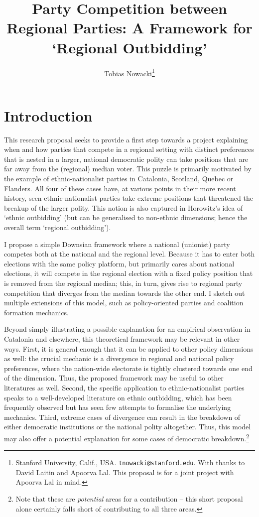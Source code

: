 \documentclass[11pt]{article}
\title{Party Competition between Regional Parties: A Framework for `Regional Outbidding'}
\author{Tobias Nowacki\thanks{Stanford University, Calif., USA. \texttt{tnowacki@stanford.edu}. With thanks to David Laitin and Apoorva Lal. This proposal is for a joint project with Apoorva Lal in mind.}}
\begin{document}
\maketitle

\onehalfspacing

\section{Introduction}

This research proposal seeks to provide a first step towards a project explaining when and how parties that compete in a regional setting with distinct preferences that is nested in a larger, national democratic polity can take positions that are far away from the (regional) median voter. This puzzle is primarily motivated by the example of ethnic-nationalist parties in Catalonia, Scotland, Quebec or Flanders. All four of these cases have, at various points in their more recent history, seen ethnic-nationalist parties take extreme positions that threatened the breakup of the larger polity. This notion is also captured in Horowitz's idea of `ethnic outbidding' (but can be generalised to non-ethnic dimensions; hence the overall term `regional outbidding'). 

I propose a simple Downsian framework where a national (unionist) party competes both at the national and the regional level. Because it has to enter both elections with the same policy platform, but primarily cares about national elections, it will compete in the regional election with a fixed policy position that is removed from the regional median; this, in turn, gives rise to regional party competition that diverges from the median towards the other end. I sketch out multiple extensions of this model, such as policy-oriented parties and coalition formation mechanics.

Beyond simply illustrating a possible explanation for an empirical observation in Catalonia and elsewhere, this theoretical framework may be relevant in other ways. First, it is general enough that it can be applied to other policy dimensions as well: the crucial mechanic is a divergence in regional and national policy preferences, where the nation-wide electorate is tightly clustered towards one end of the dimension. Thus, the proposed framework may be useful to other literatures as well. Second, the specific application to ethnic-nationalist parties speaks to a well-developed literature on ethnic outbidding, which has been frequently observed but has seen few attempts to formalise the underlying mechanics. Third, extreme cases of divergence can result in the breakdown of either democratic institutions or the national polity altogether. Thus, this model may also offer a potential explanation for some cases of democratic breakdown.\footnote{Note that these are \textit{potential} areas for a contribution -- this short proposal alone certainly falls short of contributing to all three areas.}
\end{document}
